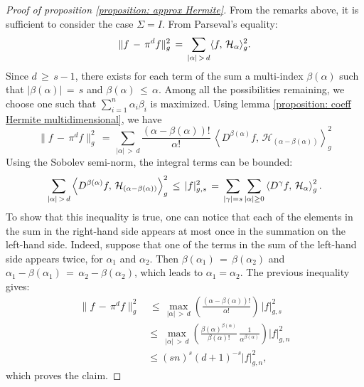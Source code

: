 \iflong\begin{proof}[Proof of proposition \ref{proposition: approx Hermite}]
    From the remarks above, it is sufficient to consider the case $\Sigma= I$. From Parseval's equality:
    $$
        \| f\,-\, \pi^d f\|_{g}^2 \,=\,\sum_{|\alpha|\,>\,d} \langle f,\, \mathcal H_{\alpha} \rangle_g^2.
    $$
    Since $d\, \geq \,s-1$, there exists for each term of the sum a multi-index
    $\beta(\alpha)$ such that $|\beta(\alpha)|\,=\,s$ and $\beta(\alpha)\, \leq \,\alpha$.
    Among all the possibilities remaining, we choose one such that
    $\sum^{n}_{i=1} \alpha_i \beta_i$ is maximized.  Using lemma
    \ref{proposition: coeff Hermite multidimensional}, we have
    $$
        \| f\,-\, \pi^df\|_{g}^2
        \,=\,\sum_{|\alpha|\,>\,d}\frac
                {(\alpha-\beta(\alpha))!}{\alpha!} \,\left\langle
            D^{\beta(\alpha)}f,\,\mathcal H_{(\alpha-\beta(\alpha))}\right\rangle_g^2
    $$
    Using the Sobolev semi-norm, the integral terms can be bounded:
    $$
        \sum_{|\alpha|\,>\,d} \left\langle D^{\beta(\alpha)}f,\,\mathcal H_{(\alpha-\beta(\alpha))}\right\rangle_g^2
        \, \leq \, |f|_{g,s}^2 \,=\, \sum_{|\gamma| = s}\sum_{|\alpha| \geq 0} \left\langle D^{\gamma}f,\,\mathcal H_{\alpha}\right\rangle_g^2. 
    $$
    To show that this inequality is true, one can notice that each of the
    elements in the sum in the right-hand side appears at most once in the
    summation on the left-hand side. Indeed, suppose that one of the terms in
    the sum of the left-hand side appears twice, for ${\alpha}_1$ and ${\alpha}_2$.
    Then ${\beta}({\alpha}_1) \,=\, {\beta}({\alpha}_2)$ and ${\alpha}_1 -{\beta}({\alpha}_1)
    \,=\,{\alpha}_2 - {\beta}({\alpha}_2)$, which leads to ${\alpha}_1 = {\alpha}_2$.  The previous inequality gives:
    $$
        \begin{aligned}
        \| f\,-\, \pi^d f\|_{g}^2 &\, \leq \,\max_{|\alpha|\,>\,d}\left({\frac
                {(\alpha-\beta(\alpha))!}{\alpha!}}\right) \, |f|_{g,s}^2 \\ 
            & \leq \, \max_{|\alpha|\,>\,d}\left(\frac{\beta(\alpha)^{\beta(\alpha)}}{\beta(\alpha)!}\,\frac
                1{\alpha^{\beta(\alpha)}}\right) |f|_{g,n}^2 \\
            & \leq (sn)^s(d+1)^{-s}|f|_{g,n}^2,
        \end{aligned}
    $$
    which proves the claim.
\end{proof} \fi
